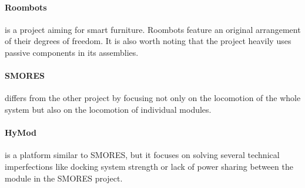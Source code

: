 \paragraph{Roombots} \cite{bonardi_locomotion_2012} is a project aiming for
smart furniture. Roombots feature an original arrangement of their degrees of
freedom. It is also worth noting that the project heavily uses passive
components in its assemblies.

\paragraph{SMORES} \cite{davey_emulating_2012} differs from the other project by
focusing not only on the locomotion of the whole system but also on the
locomotion of individual modules.

\paragraph{HyMod} \cite{gros_hymod:_2018} is a platform similar to SMORES, but
it focuses on solving several technical imperfections like docking system
strength or lack of power sharing between the module in the SMORES project.
